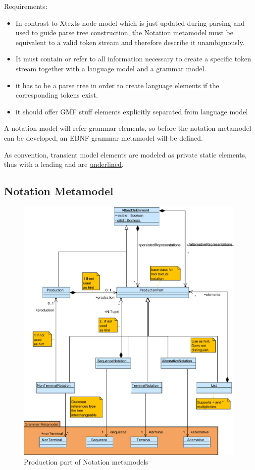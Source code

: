 Requirements:
\begin{itemize}
	\item In contrast to Xtexts node model which is just updated during parsing and used to guide parse tree construction, the Notation metamodel must be equivalent to a valid token stream and therefore describe it unambiguously. 
	\item It must contain or refer to all information necessary to create a specific token stream together with a language model and a grammar model.   
	\item it has to be a parse tree in order to create language elements if the corresponding tokens exist.
	\item it should offer GMF stuff elements 
	explicitly separated from language model
\end{itemize}

A notation model will refer grammar elements, so before the notation metamodel can be developed, an EBNF grammar metamodel will be defined.

As convention, transient model elements are modeled as private static elements, thus with a leading \code{-} and are \underline{underlined}.


\subsection{Notation Metamodel}
\begin{figure}
\centering
\includegraphics[scale=0.65]{gfx/ex/Notation_Prod} 
\caption{Production part of Notation metamodels}
\label{MM:Not:Prod}
\end{figure}

